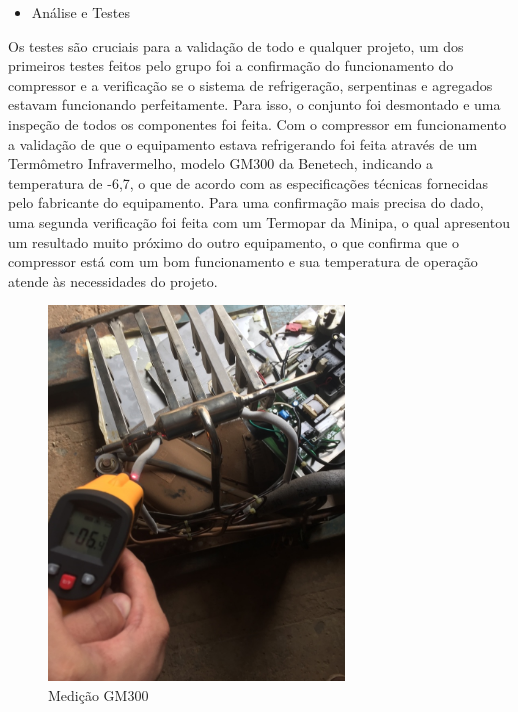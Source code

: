 \begin{itemize}
\item Análise e Testes
\end{itemize}
			 Os testes são cruciais para a validação de todo e qualquer projeto, um dos primeiros testes feitos pelo grupo foi a confirmação do funcionamento do compressor e a verificação se o sistema de refrigeração, serpentinas e agregados estavam funcionando perfeitamente. Para isso, o conjunto foi desmontado e uma inspeção de todos os componentes foi feita. Com o compressor em funcionamento a validação de que o equipamento estava refrigerando foi feita através de um Termômetro Infravermelho, modelo GM300 da Benetech, indicando a temperatura de -6,7\degree, o que de acordo com as especificações técnicas fornecidas pelo fabricante do equipamento. Para uma confirmação mais precisa do dado, uma segunda verificação foi feita com um Termopar da Minipa, o qual apresentou um resultado muito próximo do outro equipamento, o que confirma que o compressor está com um bom funcionamento e sua temperatura de operação atende às necessidades do projeto.

                   \begin{figure}[H]
    \centering
    \includegraphics[width=0.7\textwidth]{figuras/medicao_laser}
    \caption{Medição GM300}
    \label{fig:medicao_laser}
\end{figure}

